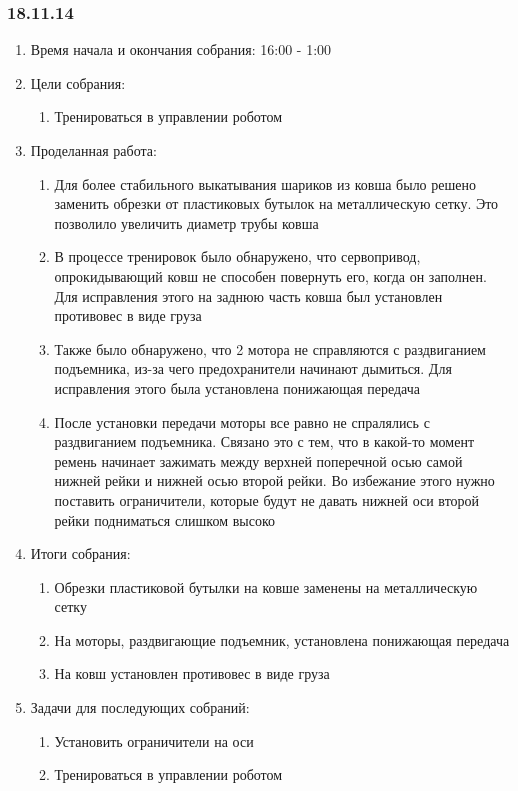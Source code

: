 \subsubsection{18.11.14}

\begin{enumerate}
	\item Время начала и окончания собрания:
	16:00 - 1:00
	\item Цели собрания:
	\begin{enumerate}
	  \item Тренироваться в управлении роботом
	  
    \end{enumerate}
	\item Проделанная работа:
	\begin{enumerate}
	  \item Для более стабильного выкатывания шариков из ковша было решено заменить обрезки от пластиковых бутылок на металлическую сетку. Это позволило увеличить диаметр трубы ковша
      
      \item В процессе тренировок было обнаружено, что сервопривод, опрокидывающий ковш не способен повернуть его, когда он заполнен. Для исправления этого на заднюю часть ковша был установлен противовес в виде груза 
      
      \item Также было обнаружено, что 2 мотора не справляются с раздвиганием подъемника, из-за чего предохранители начинают дымиться. Для исправления этого была установлена понижающая передача
      
      \item После установки передачи моторы все равно не спралялись с раздвиганием подъемника. Связано это с тем, что в какой-то момент ремень начинает зажимать между верхней поперечной осью самой нижней рейки и нижней осью второй рейки. Во избежание этого нужно поставить ограничители, которые будут не давать нижней оси второй рейки подниматься слишком высоко
          
    \end{enumerate}
    
	\item Итоги собрания: 
	\begin{enumerate}
	  \item Обрезки пластиковой бутылки на ковше заменены на металлическую сетку 
	  
      \item На моторы, раздвигающие подъемник, установлена понижающая передача
      
      \item На ковш установлен противовес в виде груза
    \end{enumerate}
    
	\item Задачи для последующих собраний:
	\begin{enumerate}
	  \item Установить ограничители на оси
	  
	  \item Тренироваться в управлении роботом

    \end{enumerate}     
\end{enumerate}
\fillpage